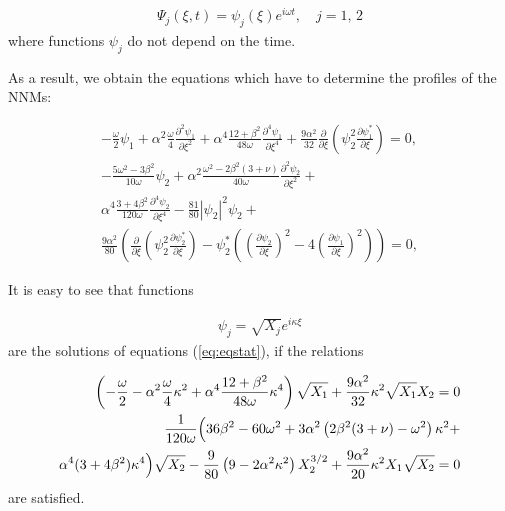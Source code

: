\begin{eqnarray}\label{eq:statsol}
\Psi_{j}(\xi,t)= \psi_{j}(\xi) e^{i \omega t}, \quad j=1,\,2
\end{eqnarray}
where functions $\psi_{j}$ do not depend on the time.

As a result, we obtain the equations which have to determine the profiles of the NNMs:

\begin{eqnarray}\label{eq:eqstat}
-   \frac{\omega}{2} \psi_{1}+\alpha^2\frac{\omega}{4} \frac{\partial^2 \psi_{1}}{\partial \xi^2} + \alpha^{4} \frac{12+\beta^2}{48 \omega} \frac{\partial^4 \psi_{1}}{\partial \xi^4}+ \frac{9 \alpha^2}{32} \frac{\partial }{\partial \xi} \left( \psi_{2}^{2} \frac{\partial \psi_{1}^{*}}{\partial \xi} \right) =0,   \nonumber   \\
-   \frac{5 \omega^2-3 \beta^2}{10 \omega} \psi_{2}+ \alpha^2 \frac{\omega^2-2\beta^2 (3+\nu)}{40 \omega} \frac{\partial^2 \psi_{2}}{\partial \xi^2}+  \\  
\alpha^4 \frac{3+4\beta^2}{120 \omega} \frac{\partial^4 \psi_{2}}{\partial \xi^4} 
-   \frac{81}{80}|\psi_{2}|^2 \psi_{2}+  \nonumber  \\
\frac{9 \alpha^2}{80}  \left( \frac{\partial }{\partial \xi} \left( \psi_{2}^2 \frac{\partial \psi_{2}^{*}}{\partial \xi} \right) - \psi_{2}^{*} \left( \left(\frac{\partial \psi_{2}}{\partial \xi} \right)^2 - 4 \left( \frac{\partial \psi_{1}}{\partial \xi} \right)^2 \right) \right) =0,  \nonumber
\end{eqnarray}

It is easy to see that functions

\begin{eqnarray}\label{eq:psistat}
\psi_{j}=\sqrt{X_{j}} e^{i \kappa \xi}
\end{eqnarray}
are the solutions of equations (\ref{eq:eqstat}), if the relations

\begin{eqnarray}\label{eq:Astat}
\left(- \frac{\omega}{2}-\alpha^2 \frac{\omega}{4} \kappa^2 +\alpha^4 \frac{12+\beta^2}{48 \omega} \kappa^4 \right) \sqrt{X_{1}} +\frac{9 \alpha^2}{32} \kappa^2 \sqrt{X_{1}} X_{2} =0   \nonumber  \\
\frac{1}{120 \omega} \Bigl( 36 \beta^2 - 60 \omega^2 + 3 \alpha^2 \left( 2 \beta^2 (3+\nu) - \omega^2 \right) \kappa^2 +   \\
\alpha^4 (3+4 \beta^2) \kappa^4 \Bigr) \sqrt{X_{2}}-  \frac{9}{80}  \left( 9- 2 \alpha^2 \kappa^2 \right) X_{2}^{3/2}+ \frac{9 \alpha^2}{20} \kappa^2 X_{1} \sqrt{X_{2}} = 0 \nonumber
\end{eqnarray}
are satisfied.

